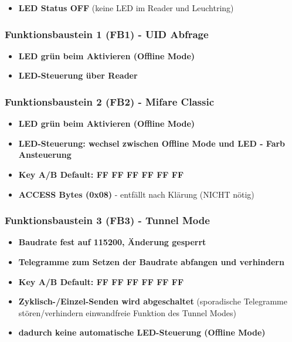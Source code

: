 \documentclass[a4paper,11pt]{article}
\providecommand{\tightlist}{\setlength{\itemsep}{0pt}\setlength{\parskip}{0pt}}
\begin{document}
\begin{itemize}
\tightlist
\item
  \textbf{LED Status OFF} (keine LED im Reader und Leuchtring)
\end{itemize}

\hypertarget{funktionsbaustein-1-fb1---uid-abfrage}{%
\subsubsection{Funktionsbaustein 1 (FB1) - UID
Abfrage}\label{funktionsbaustein-1-fb1---uid-abfrage}}

\begin{itemize}
\tightlist
\item
  \textbf{LED grün beim Aktivieren (Offline Mode)}
\item
  \textbf{LED-Steuerung über Reader}
\end{itemize}

\hypertarget{funktionsbaustein-2-fb2---mifare-classic}{%
\subsubsection{Funktionsbaustein 2 (FB2) - Mifare
Classic}\label{funktionsbaustein-2-fb2---mifare-classic}}

\begin{itemize}
\tightlist
\item
  \textbf{LED grün beim Aktivieren (Offline Mode)}
\item
  \textbf{LED-Steuerung: wechsel zwischen Offline Mode und LED - Farb
  Ansteuerung}
\item
  \textbf{Key A/B Default: FF FF FF FF FF FF}
\item
  \textbf{ACCESS Bytes (0x08)} - entfällt nach Klärung (NICHT nötig)
\end{itemize}

\hypertarget{funktionsbaustein-3-fb3---tunnel-mode}{%
\subsubsection{Funktionsbaustein 3 (FB3) - Tunnel
Mode}\label{funktionsbaustein-3-fb3---tunnel-mode}}

\begin{itemize}
\tightlist
\item
  \textbf{Baudrate fest auf 115200, Änderung gesperrt}
\item
  \textbf{Telegramme zum Setzen der Baudrate abfangen und verhindern}
\item
  \textbf{Key A/B Default: FF FF FF FF FF FF}
\item
  \textbf{Zyklisch-/Einzel-Senden wird abgeschaltet} (sporadische
  Telegramme stören/verhindern einwandfreie Funktion des Tunnel Modes)
\item
  \textbf{dadurch keine automatische LED-Steuerung (Offline Mode)}
\end{itemize}
\end{document}

